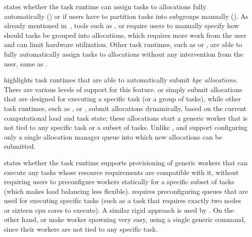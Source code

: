 \begin{description}[wide=0pt]
	\item[Graph partitioning] states whether the task runtime can assign tasks to allocations fully automatically (\automaticmap)
		or if users have to partition tasks into subgroups manually (\manualmap). As already mentioned
		in~, tools such as \pegasus{}, \autosubmit{} or
		\snakemake{} require users to manually specify how should tasks be grouped into
		allocations, which requires more work from the user and can limit hardware utilization. Other task
		runtimes, such as \dask{} or \balsam{}, are able to fully
		automatically assign tasks to allocations without any intervention from the user, same as
		\hyperqueue{}.

	\item[Automatic allocation] highlights task runtimes that are able to automatically submit \emph{\gls{hpc} allocations}. There are
		various levels of support for this feature. \snakemake{} or \autosubmit{}
		simply submit allocations that are designed for executing a specific task (or a group of tasks),
		while other task runtimes, such as \dask{}, \balsam{} or
		\hyperqueue{}, submit allocations dynamically, based on the current computational load
		and task state; these allocations start a generic worker that is not tied to any specific task or a
		subset of tasks. Unlike \hyperqueue{}, \dask{} and
		\balsam{} support configuring only a single allocation manager queue into which new
		allocations can be submitted.

	\item[Generic workers] states whether the task runtime supports provisioning of generic workers that can execute any tasks
		whose resource requirements are compatible with it, without requiring users to preconfigure workers
		statically for a specific subset of tasks (which makes load balancing less flexible).
		\merlin{} requires preconfiguring queues that are used for executing specific tasks
		(such as a task that requires exactly two nodes or sixteen \gls{cpu} cores to
		execute). A similar rigid approach is used by \parsl{}. On the other hand,
		\dask{} or \hyperqueue{} make worker spawning very easy, using a single
		generic command, since their workers are not tied to any specific task.
\end{description}

